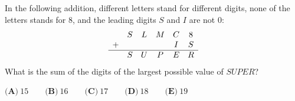 In the following addition, different letters stand for different digits, none of the letters stands for $8$, and the leading digits $S$ and $I$ are not $0$:
\[
\begin{array}{cccccc}
 & S & L & M & C & 8\\
+ & & & & I & S\\ \hline
 & S & U & P & E & R
\end{array}
\]
What is the sum of the digits of the largest possible value of $SUPER$?

$\textbf{(A)}\ 15\qquad\textbf{(B)}\ 16\qquad\textbf{(C)}\ 17\qquad\textbf{(D)}\ 18\qquad\textbf{(E)}\ 19$

